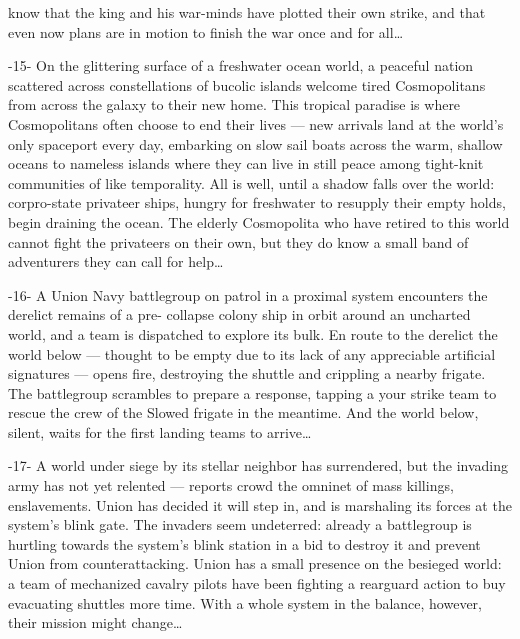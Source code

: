                                                                                                                   


know that the king and his war-minds have plotted their own strike, and that even now plans are  
in motion to finish the war once and for all…  

                                                    -15-  
On the glittering surface of a freshwater ocean world, a peaceful nation scattered across  
constellations of bucolic islands welcome tired Cosmopolitans from across the galaxy to their  
new home. This tropical paradise is where Cosmopolitans often choose to end their lives — new  
arrivals land at the world’s only spaceport every day, embarking on slow sail boats across the  
warm, shallow oceans to nameless islands where they can live in still peace among tight-knit  
communities of like temporality. All is well, until a shadow falls over the world: corpro-state  
privateer ships, hungry for freshwater to resupply their empty holds, begin draining the ocean.  
The elderly Cosmopolita who have retired to this world cannot fight the privateers on their own,  
but they do know a small band of adventurers they can call for help…  

                                                    -16-  
A Union Navy battlegroup on patrol in a proximal system encounters the derelict remains of a pre- 
collapse colony ship in orbit around an uncharted world, and a team is dispatched to explore its  
bulk. En route to the derelict the world below — thought to be empty due to its lack of any  
appreciable artificial signatures — opens fire, destroying the shuttle and crippling a nearby frigate.  
The battlegroup scrambles to prepare a response, tapping a your strike team to rescue the crew  
of the Slowed frigate in the meantime. And the world below, silent, waits for the first landing  
teams to arrive…  

                                                    -17-  
A world under siege by its stellar neighbor has surrendered, but the invading army has not yet  
relented — reports crowd the omninet of mass killings, enslavements. Union has decided it will  
step in, and is marshaling its forces at the system’s blink gate. The invaders seem undeterred:  
already a battlegroup is hurtling towards the system’s blink station in a bid to destroy it and  
prevent Union from counterattacking. Union has a small presence on the besieged world: a team  
of mechanized cavalry pilots have been fighting a rearguard action to buy evacuating shuttles  
more time. With a whole system in the balance, however, their mission might change…  

